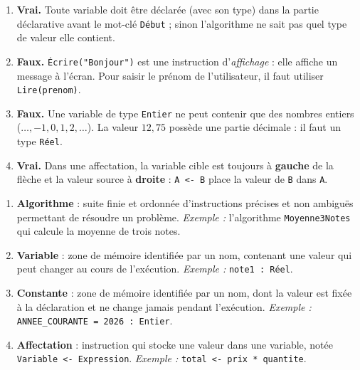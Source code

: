 \documentclass[11pt]{article}
\begin{document}
\begin{corrige}
\begin{enumerate}
\item \textbf{Vrai.} Toute variable doit être déclarée (avec son type) dans la partie déclarative avant le mot-clé \texttt{Début} ; sinon l'algorithme ne sait pas quel type de valeur elle contient.
\item \textbf{Faux.} \texttt{Écrire("Bonjour")} est une instruction d'\emph{affichage} : elle affiche un message à l'écran. Pour saisir le prénom de l'utilisateur, il faut utiliser \texttt{Lire(prenom)}.
\item \textbf{Faux.} Une variable de type \texttt{Entier} ne peut contenir que des nombres entiers ($\ldots, -1, 0, 1, 2, \ldots$). La valeur $12,75$ possède une partie décimale : il faut un type \texttt{Réel}.
\item \textbf{Vrai.} Dans une affectation, la variable cible est toujours à \textbf{gauche} de la flèche et la valeur source à \textbf{droite} : \texttt{A <- B} place la valeur de \texttt{B} dans \texttt{A}.
\end{enumerate}
\end{corrige}

\begin{corrige}
\begin{enumerate}
\item \textbf{Algorithme} : suite finie et ordonnée d'instructions précises et non ambiguës permettant de résoudre un problème. \emph{Exemple :} l'algorithme \texttt{Moyenne3Notes} qui calcule la moyenne de trois notes.
\item \textbf{Variable} : zone de mémoire identifiée par un nom, contenant une valeur qui peut changer au cours de l'exécution. \emph{Exemple :} \texttt{note1 : Réel}.
\item \textbf{Constante} : zone de mémoire identifiée par un nom, dont la valeur est fixée à la déclaration et ne change jamais pendant l'exécution. \emph{Exemple :} \texttt{ANNEE\_COURANTE = 2026 : Entier}.
\item \textbf{Affectation} : instruction qui stocke une valeur dans une variable, notée \texttt{Variable <- Expression}. \emph{Exemple :} \texttt{total <- prix * quantite}.
\end{enumerate}
\end{corrige}
\end{document}
